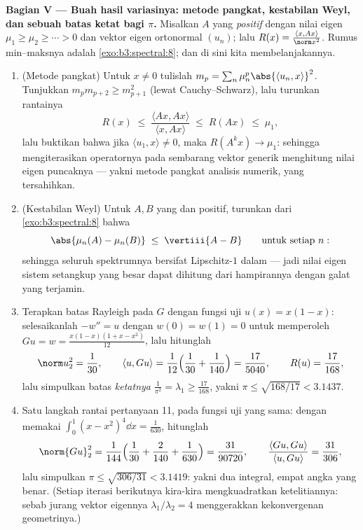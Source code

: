 \begin{problem}
\medskip
\noindent\textbf{Bagian V --- Buah hasil variasinya: metode
pangkat, kestabilan Weyl, dan sebuah batas ketat bagi $\pi$.} Misalkan
$A$   yang \emph{positif} dengan
nilai eigen $\mu_1 \geq \mu_2 \geq \cdots > 0$ dan
vektor eigen ortonormal $(u_n)$; lalu $R(x) = \frac{\langle x,
Ax\rangle}{\norm x^2}$. Rumus min--maksnya adalah
\cref{exo:b3:spectral:8}; dan di sini kita membelanjakannya.
\begin{enumerate}[resume]
  \item (Metode pangkat) Untuk $x \neq 0$ tulislah $m_p =
        \sum_n\mu_n^p\abs{\langle u_n, x\rangle}^2$. Tunjukkan
        $m_pm_{p+2} \geq m_{p+1}^2$ (lewat Cauchy--Schwarz), lalu turunkan
        rantainya
        \[
        R(x) \;\leq\; \frac{\langle Ax, Ax\rangle}{\langle x,
        Ax\rangle} \;\leq\; R(Ax) \;\leq\; \mu_1,
        \]
        lalu buktikan bahwa jika $\langle u_1, x\rangle \neq 0$,
        maka $R(A^kx) \to \mu_1$: sehingga mengiterasikan operatornya pada
        sembarang vektor generik menghitung nilai eigen puncaknya ---
        yakni metode pangkat analisis numerik, yang tersahihkan.
  \item (Kestabilan Weyl) Untuk $A, B$ yang   dan positif,
        turunkan dari \cref{exo:b3:spectral:8} bahwa
        \[
        \abs{\mu_n(A) - \mu_n(B)} \;\leq\; \vertiii{A - B}
        \qquad\text{untuk setiap } n :
        \]
        sehingga seluruh spektrumnya bersifat Lipschitz-$1$ dalam  --- jadi nilai eigen sistem setangkup yang besar dapat
        dihitung dari hampirannya dengan galat yang terjamin.
  \item Terapkan batas Rayleigh pada $G$ dengan fungsi uji
        $u(x) = x(1-x)$: selesaikanlah $-w'' = u$ dengan $w(0) =
        w(1) = 0$ untuk memperoleh $Gu = w = \frac{x(1-x)(1 + x -
        x^2)}{12}$, lalu hitunglah
        \[
        \norm u_2^2 = \frac1{30}, \qquad
        \langle u, Gu\rangle = \frac1{12}\Bigl(\frac1{30} +
        \frac1{140}\Bigr) = \frac{17}{5040},
        \qquad R(u) = \frac{17}{168},
        \]
        lalu simpulkan batas \emph{ketatnya} $\frac1{\pi^2}
        = \lambda_1 \geq \frac{17}{168}$, yakni $\pi \leq
        \sqrt{168/17} < 3.1437$.
  \item Satu langkah rantai pertanyaan 11, pada fungsi uji
        yang sama: dengan memakai $\int_0^1(x - x^2)^4\dd x =
        \frac1{630}$, hitunglah
        \[
        \norm{Gu}_2^2 = \frac1{144}\Bigl(\frac1{30} +
        \frac2{140} + \frac1{630}\Bigr) = \frac{31}{90720},
        \qquad
        \frac{\langle Gu, Gu\rangle}{\langle u, Gu\rangle} =
        \frac{31}{306},
        \]
        lalu simpulkan $\pi \leq \sqrt{306/31} < 3.1419$: yakni dua
        integral, empat angka yang benar. (Setiap iterasi berikutnya
        kira-kira mengkuadratkan ketelitiannya: sebab jurang vektor eigennya
        $\lambda_1/\lambda_2 = 4$ menggerakkan kekonvergenan
        geometrinya.)
\end{enumerate}


\end{problem}
